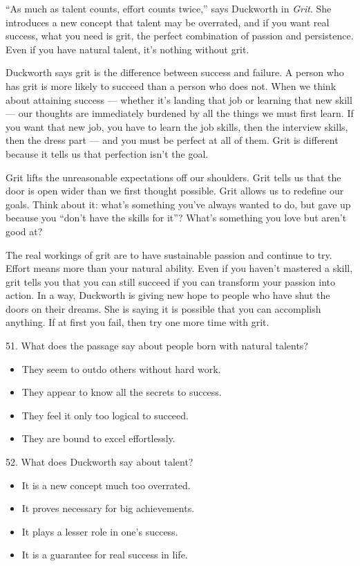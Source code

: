 \documentclass[UTF8,11pt]{ctexart}
\begin{document}
“As much as talent counts, effort counts twice,” says Duckworth in \textit{Grit}. She introduces a new concept that talent may be overrated, and if you want real success, what you need is grit, the perfect combination of passion and persistence. Even if you have natural talent, it’s nothing without grit.


Duckworth says grit is the difference between success and failure. A person who has grit is more likely to succeed than a person who does not. When we think about attaining success — whether it’s landing that job or learning that new skill — our thoughts are immediately burdened by all the things we must first learn. If you want that new job, you have to learn the job skills, then the interview skills, then the dress part — and you must be perfect at all of them. Grit is different because it tells us that perfection isn’t the goal.


Grit lifts the unreasonable expectations off our shoulders. Grit tells us that the door is open wider than we first thought possible. Grit allows us to redefine our goals. Think about it: what’s something you’ve always wanted to do, but gave up because you “don’t have the skills for it”? What’s something you love but aren’t good at?


The real workings of grit are to have sustainable passion and continue to try. Effort means more than your natural ability. Even if you haven’t mastered a skill, grit tells you that you can still succeed if you can transform your passion into action. In a way, Duckworth is giving new hope to people who have shut the doors on their dreams. She is saying it is possible that you can accomplish anything. If at first you fail, then try one more time with grit.


51. What does the passage say about people born with natural talents?


\begin{itemize}[leftmargin=2em,itemsep=.2em,topsep=.4em]\item[A.] They seem to outdo others without hard work.
\item[B.] They appear to know all the secrets to success.
\item[C.] They feel it only too logical to succeed.
\item[D.] They are bound to excel effortlessly.
\end{itemize}

52. What does Duckworth say about talent?


\begin{itemize}[leftmargin=2em,itemsep=.2em,topsep=.4em]\item[A.] It is a new concept much too overrated.
\item[B.] It proves necessary for big achievements.
\item[C.] It plays a lesser role in one’s success.
\item[D.] It is a guarantee for real success in life.
\end{itemize}
\end{document}
